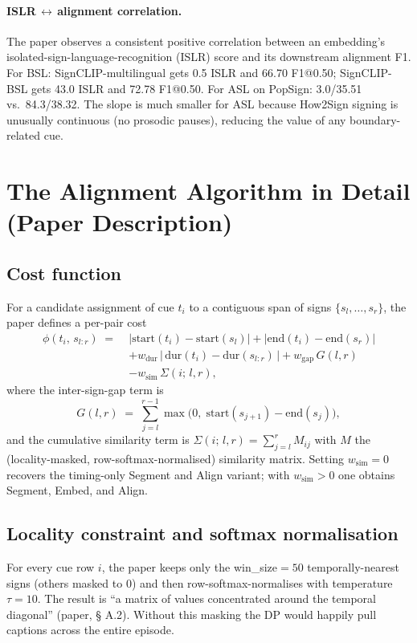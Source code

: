 \documentclass[11pt,a4paper]{article}
\def\texttt#1{#1}%
\def\emph#1{#1}%
\begin{document}
\paragraph{ISLR$\,\leftrightarrow\,$alignment correlation.} The paper observes
a consistent positive correlation between an embedding's
isolated-sign-language-recognition (ISLR) score and its downstream alignment
F1. For BSL: SignCLIP-multilingual gets 0.5 ISLR and 66.70 F1@0.50;
SignCLIP-BSL gets 43.0 ISLR and 72.78 F1@0.50. For ASL on PopSign: 3.0/35.51
vs.\ 84.3/38.32. The slope is much smaller for ASL because How2Sign signing
is unusually continuous (no prosodic pauses), reducing the value of any
boundary-related cue.


\section{The Alignment Algorithm in Detail (Paper Description)}
\label{sec:paper-align}

\subsection{Cost function}
For a candidate assignment of cue $t_i$ to a contiguous span of signs
$\{s_l, \ldots, s_r\}$, the paper defines a per-pair cost
\begin{align}
\phi(t_i,\,s_{l:r}) \;=\;
& \bigl|\mathrm{start}(t_i) - \mathrm{start}(s_l)\bigr|
  + \bigl|\mathrm{end}(t_i)   - \mathrm{end}(s_r)\bigr| \nonumber\\
& + w_{\mathrm{dur}} \,\bigl|\,\mathrm{dur}(t_i) - \mathrm{dur}(s_{l:r})\,\bigr|
  + w_{\mathrm{gap}} \,G(l,r) \nonumber\\
& - w_{\mathrm{sim}} \,\Sigma(i;\,l,r),
\label{eq:cost}
\end{align}
where the inter-sign-gap term is
\[
G(l,r) \;=\;
\sum_{j=l}^{r-1} \max\bigl(0,\;\mathrm{start}(s_{j+1}) - \mathrm{end}(s_j)\bigr),
\]
and the cumulative similarity term is
$\Sigma(i;\,l,r) = \sum_{j=l}^{r} M_{ij}$
with $M$ the (locality-masked, row-softmax-normalised) similarity matrix.
Setting $w_{\mathrm{sim}} = 0$ recovers the timing-only \emph{Segment and
Align} variant; with $w_{\mathrm{sim}} > 0$ one obtains \emph{Segment, Embed,
and Align}.

\subsection{Locality constraint and softmax normalisation}
For every cue row $i$, the paper keeps only the
\texttt{win\_size}${} = 50$ temporally-nearest signs (others masked to 0)
and then row-softmax-normalises with temperature $\tau = 10$. The result is
``a matrix of values concentrated around the temporal diagonal'' (paper, \S
A.2). Without this masking the DP would happily pull captions across the
entire episode.
\end{document}
